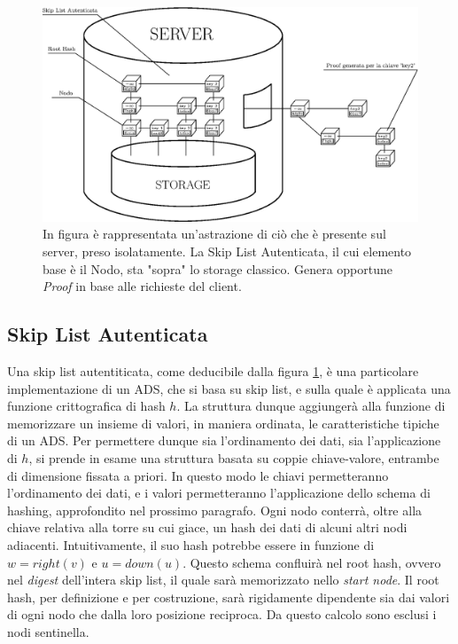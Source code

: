 	\begin{figure}
		\centering
		\includegraphics[scale=0.75]{figure/global.eps}
		\caption{In figura è rappresentata un'astrazione di ciò che è presente sul server, preso isolatamente. La Skip List Autenticata, il cui elemento base è il Nodo, sta "sopra" lo storage classico. Genera opportune \textit{Proof} in base alle richieste del client.}\label{fig:8}
	\end{figure}
	
	\subsection{Skip List Autenticata}
	
%		

	Una skip list autentiticata, come deducibile dalla figura \ref{fig:8}, è una particolare implementazione di un ADS, che si basa su skip list, e sulla quale è applicata una funzione crittografica di hash $ h $. La struttura dunque aggiungerà alla funzione di memorizzare un insieme di valori, in maniera ordinata, le caratteristiche tipiche di un ADS. Per permettere dunque sia l'ordinamento dei dati, sia l'applicazione di $ h $, si prende in esame una struttura  basata su coppie chiave-valore, entrambe di dimensione fissata a priori. In questo modo le chiavi permetteranno l'ordinamento dei dati, e i valori permetteranno l'applicazione dello schema di hashing, approfondito nel prossimo paragrafo. Ogni nodo conterrà, oltre alla chiave relativa alla torre su cui giace, un hash dei dati di alcuni altri nodi adiacenti. Intuitivamente, il suo hash potrebbe essere in funzione di $ w = right(v) $ e $ u = down(u) $. Questo schema confluirà nel root hash, ovvero nel \textit{digest} dell'intera skip list, il quale sarà memorizzato nello \textit{start node}.
	Il root hash, per definizione e per costruzione, sarà rigidamente dipendente sia dai valori di ogni nodo che dalla loro posizione reciproca. Da questo calcolo sono esclusi i nodi sentinella.
	
